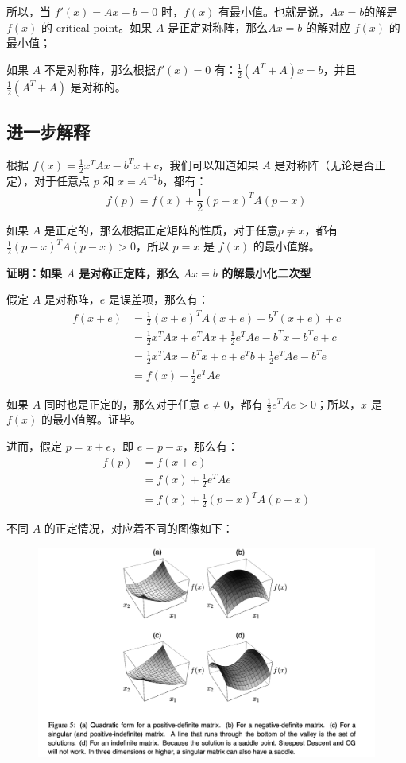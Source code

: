 \documentclass[12pt]{article}
\begin{document}
所以，当 $f'(x) = Ax - b = 0$ 时，$f(x)$ 有最小值。也就是说，$Ax=b$的解是 $f(x)$ 的 critical point。如果 $A$ 是正定对称阵，那么$Ax=b$ 的解对应 $f(x)$  的最小值；

如果 $A$ 不是对称阵，那么根据$f'(x) = 0$ 有：$\frac{1}{2}(A^T+A)x = b$，并且 $\frac{1}{2}(A^T+A)$ 是对称的。

\subsection{进一步解释}
根据 $f(x) = \frac{1}{2}x^TAx - b^Tx + c$，我们可以知道如果 $A$ 是对称阵（无论是否正定），对于任意点 $p$ 和 $x = A^{-1}b$，都有：
$$
f(p) = f(x) + \frac{1}{2}(p-x)^TA(p-x)
$$

如果 $A$ 是正定的，那么根据正定矩阵的性质，对于任意$p \neq x$，都有 $\frac{1}{2}(p-x)^TA(p-x) > 0$，所以 $p = x$ 是 $f(x)$ 的最小值解。

\begin{framed}
\textbf{证明：如果 $A$ 是对称正定阵，那么 $Ax=b$ 的解最小化二次型}

假定 $A$ 是对称阵，$e$ 是误差项，那么有：
\begin{align*}
f(x+e) &= \frac{1}{2}(x+e)^TA(x+e) - b^T(x+e) + c \\
	  &= \frac{1}{2}x^TAx + e^TAx + \frac{1}{2}e^TAe - b^Tx - b^Te + c \\
	  &= \frac{1}{2}x^TAx - b^Tx + c + e^Tb + \frac{1}{2}e^TAe - b^Te \\
	  &= f(x) + \frac{1}{2}e^TAe
\end{align*}

如果 $A$ 同时也是正定的，那么对于任意 $e \neq 0$，都有 $\frac{1}{2}e^TAe > 0$；所以，$x$ 是 $f(x)$ 的最小值解。证毕。

进而，假定 $p = x + e$，即 $e = p - x$，那么有：
\begin{align*}
f(p) &= f(x + e) \\
      &= f(x) + \frac{1}{2}e^TAe \\
      &= f(x) + \frac{1}{2}(p-x)^TA(p-x)
\end{align*}
\end{framed}

不同 $A$ 的正定情况，对应着不同的图像如下：
\begin{figure}[H]
    \centering
    \includegraphics[width=1\textwidth]{fig/CG_Plot_Eq_5.png}
\end{figure}
\end{document}
